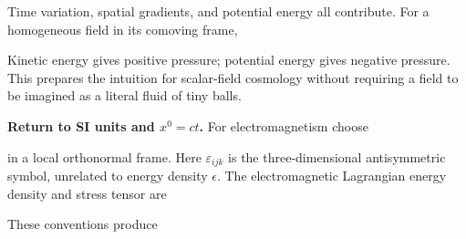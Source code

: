 \documentclass[
  11pt,
  letterpaper,
  oneside,
  openany]{scrbook}
\begin{document}
Time variation, spatial gradients, and potential energy all contribute.
For a homogeneous field in its comoving frame,

\begin{center}
\begingroup
{}
\ifdim\wd\grmathbox>\linewidth
\resizebox{\linewidth}{!}{\usebox{\grmathbox}}
\else\usebox{\grmathbox}\fi
\endgroup
\end{center}

Kinetic energy gives positive pressure; potential energy gives negative
pressure. This prepares the intuition for scalar-field cosmology without
requiring a field to be imagined as a literal fluid of tiny balls.

\textbf{Return to SI units and \(x^0=ct\).} For electromagnetism choose

\begin{center}
\begingroup
{}
\ifdim\wd\grmathbox>\linewidth
\resizebox{\linewidth}{!}{\usebox{\grmathbox}}
\else\usebox{\grmathbox}\fi
\endgroup
\end{center}

in a local orthonormal frame. Here \(\varepsilon_{ijk}\) is the
three-dimensional antisymmetric symbol, unrelated to energy density
\(\epsilon\). The electromagnetic Lagrangian energy density and stress
tensor are

\begin{center}
\begingroup
{}
\ifdim\wd\grmathbox>\linewidth
\resizebox{\linewidth}{!}{\usebox{\grmathbox}}
\else\usebox{\grmathbox}\fi
\endgroup
\end{center}

\begin{center}
\begingroup
{}
\ifdim\wd\grmathbox>\linewidth
\resizebox{\linewidth}{!}{\usebox{\grmathbox}}
\else\usebox{\grmathbox}\fi
\endgroup
\end{center}

These conventions produce
\end{document}
